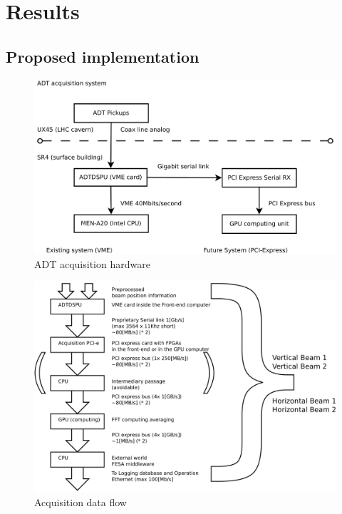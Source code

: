%

\chapter{Results}

\section{Proposed implementation}

\begin{figure}[H]
\caption{ADT acquisition hardware}
\includegraphics[scale=0.3]{acquisition.pdf}
\end{figure}

\begin{figure}[H]
\caption{Acquisition data flow}
\includegraphics[scale=0.3]{dataflow.pdf}
\end{figure}
